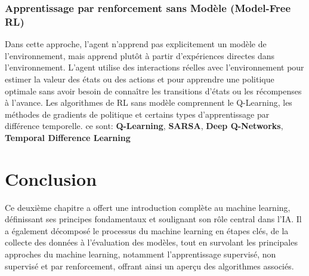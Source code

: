 \subsubsection{Apprentissage par renforcement sans Modèle (Model-Free RL)}
Dans cette approche, l'agent n'apprend pas explicitement un modèle de l'environnement, mais apprend plutôt à partir d'expériences directes dans l'environnement. L'agent utilise des interactions réelles avec l'environnement pour estimer la valeur des états ou des actions et pour apprendre une politique optimale sans avoir besoin de connaître les transitions d'états ou les récompenses à l'avance. Les algorithmes de RL sans modèle comprennent le Q-Learning, les méthodes de gradients de politique et certains types d'apprentissage par différence temporelle. ce sont: \textbf{Q-Learning}, \textbf{SARSA}, \textbf{Deep Q-Networks}, \textbf{Temporal Difference Learning} 

\section{Conclusion}
Ce deuxième chapitre a offert une introduction complète au machine learning, définissant
ses principes fondamentaux et soulignant son rôle central dans l’IA. Il a également décomposé
le processus du machine learning en étapes clés, de la collecte des données à l’évaluation des
modèles, tout en survolant les principales approches du machine learning, notamment l’apprentissage
supervisé, non supervisé et par renforcement, offrant ainsi un aperçu des algorithmes associés.